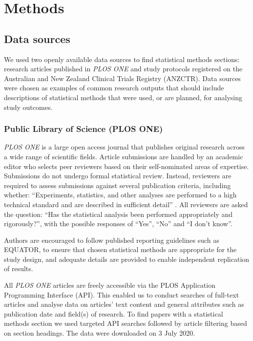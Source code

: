 \documentclass[12pt]{article}
\begin{document}
\hypertarget{methods}{%
\section{Methods}\label{methods}}

\subsection{Data sources}

We used two openly available data sources to find statistical methods
sections: research articles published in \emph{PLOS ONE} and study
protocols registered on the Australian and New Zealand Clinical Trials
Registry (ANZCTR). Data sources were chosen as examples of common
research outputs that should include descriptions of statistical methods that
were used, or are planned, for analysing study outcomes.

\subsubsection{Public Library of Science (PLOS ONE)}
\label{sec:methodsPLOS}

\emph{PLOS ONE} is a large open access journal that publishes original
research across a wide range of scientific fields. Article submissions
are handled by an academic editor who selects peer reviewers based on
their self-nominated areas of expertise. Submissions do not undergo
formal statistical review. Instead, reviewers are required to assess
submissions against several publication criteria, including whether:
``Experiments, statistics, and other analyses are performed to a high
technical standard and are described in sufficient detail''
\citep{PLOS}. All reviewers are asked the question: ``Has the
statistical analysis been performed appropriately and rigorously?'',
with the possible responses of ``Yes'', ``No'' and ``I don't know''.

Authors are encouraged to follow published reporting guidelines such as
EQUATOR, to ensure that chosen statistical methods are appropriate for
the study design, and adequate details are provided to enable
independent replication of results.

All \emph{PLOS ONE} articles are freely accessible via the PLOS
Application Programming Interface (API). This enabled us to conduct
searches of full-text articles and analyse data on articles' text
content and general attributes such as publication date and field(s) of
research. To find papers with a statistical methods section we used
targeted API searches followed by article filtering based on section
headings. The data were downloaded on 3 July 2020.
\end{document}
